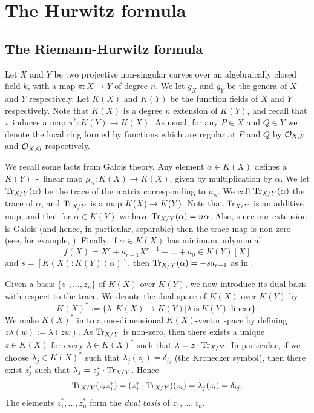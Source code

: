 \chapter{The Hurwitz formula} \label{Chapter:hurwitzformula}
\section{The Riemann-Hurwitz formula}\label{Hurwitzsection}

Let $X$ and $Y$ be two projective non-singular curves over an algebraically closed field $k$, with a map $\pi \colon X \rightarrow Y$ of degree $n$.
We let $g_X$ and $g_Y$ be the genera of $X$ and $Y$ respectively.
Let $K(X)$ and $K(Y)$ be the function fields of $X$ and $Y$ respectively.
Note that $K(X)$ is a degree $n$ extension of $K(Y)$, and recall that $\pi$ induces a map $\pi^*\colon K(Y) \rightarrow K(X)$.
As usual, for any $P \in X$ and $Q \in Y$ we denote the local ring formed by functions which are regular at $P$ and $Q$ by ${\cal O}_{X,P}$ and ${\cal O}_{X,Q}$ respectively.

We recall some facts from Galois theory.
Any element $\alpha \in K(X)$ defines a $K(Y)$~-~linear map $\mu_{\alpha} \colon  K(X) \rightarrow K(X)$, given by multiplication by $\alpha$.
We let $\operatorname{Tr}_{X/Y}(\alpha)$ be the trace of the matrix corresponding to $\mu_\alpha$.
We call $\operatorname{Tr}_{X/Y}(\alpha)$ the trace of $\alpha$, and $\operatorname{Tr}_{X/Y}$ is a map $K(X) \rightarrow K(Y)$.
Note that $\operatorname{Tr}_{X/Y}$ is an additive map, and that for $\alpha \in K(Y)$ we have $\operatorname{Tr}_{X/Y}(\alpha) = n \alpha$.
Also, since our extension is Galois (and hence, in particular, separable) then the trace map is non-zero (see, for example, \cite[Appendix A]{stichtenoth}).
Finally, if $\alpha \in K(X)$ has minimum polynomial 
    \[
    f(X) = X^r + a_{r-1}X^{r-1} + \ldots +a_0 \in K(Y)[X]
    \]
and $s= [K(X):K(Y)(\alpha)]$, then $\operatorname{Tr}_{X/Y}(\alpha) = -sa_{r-1}$ as in \cite[Appendix A]{stichtenoth}.

Given a basis $\{z_1,\ldots,z_n\}$ of $K(X)$ over $K(Y)$, we now introduce its dual basis with respect to the trace.
We denote the dual space of $K(X)$ over $K(Y)$ by 
    \[
    K(X)^*:=\{\lambda \colon K(X) \rightarrow K(Y)| \lambda\ \text{is}\ K(Y)\text{-linear}\}.
    \]
We make $K(X)^*$ in to a one-dimensional $K(X)$-vector space by defining $z \lambda(w):=\lambda(z w)$.
As $\operatorname{Tr}_{X/Y}$ is non-zero, then there exists a unique $z\in K(X)$ for every $\lambda \in K(X)^*$ such that $\lambda = z\cdot \operatorname{Tr}_{X/Y}$.
In particular, if we choose $\lambda_j\in K(X)^*$ such that $\lambda_j(z_i) = \delta_{ij}$ (the Kronecker symbol), then there exist $z_j^*$ such that $\lambda_j = z_j^*\cdot \operatorname{Tr}_{X/Y}$.
Hence
    \[
    \operatorname{Tr}_{X/Y}(z_iz_j^*) = (z_j^*\cdot \operatorname{Tr}_{X/Y})(z_i) = \lambda_j(z_i) = \delta_{ij}.
    \]
The elements $z_1^*, \ldots , z_n^*$ form the {\em dual basis} of $z_1, \ldots , z_n$.

